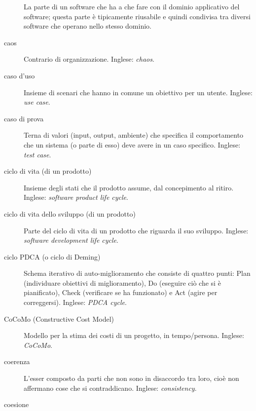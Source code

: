 \documentclass[a4paper]{article}
\begin{document}
\begin{description}
			La parte di un software che ha a che fare con il dominio applicativo del software; questa parte è tipicamente riusabile e quindi condivisa tra diversi software che operano nello stesso dominio.
			
	\item[caos] 

			Contrario di organizzazione. Inglese: \emph{chaos}.
			
	\item[caso d'uso] 

			Insieme di scenari che hanno in comune un obiettivo per un utente. Inglese: \emph{use case}.
			
	\item[caso di prova] 

			Terna di valori (input, output, ambiente) che specifica il comportamento che un sistema (o parte di esso) deve avere in un caso specifico. Inglese: \emph{test case}.
			
	\item[ciclo di vita (di un prodotto)] 

			Insieme degli stati che il prodotto assume, dal concepimento al ritiro. Inglese: \emph{software product life cycle}.
			
	\item[ciclo di vita dello sviluppo (di un prodotto)] 

			Parte del ciclo di vita di un prodotto che riguarda il suo sviluppo. Inglese: \emph{software development life cycle}.
			
	\item[ciclo PDCA (o ciclo di Deming)] 

			Schema iterativo di auto-miglioramento che consiste di quattro punti: Plan (individuare obiettivi di miglioramento), Do (eseguire ciò che si è pianificato), Check (verificare se ha funzionato) e Act (agire per correggersi). Inglese: \emph{PDCA cycle}.
			
	\item[CoCoMo (Constructive Cost Model)] 

			Modello per la stima dei costi di un progetto, in tempo/persona. Inglese: \emph{CoCoMo}.
			
	\item[coerenza] 

			L'esser composto da parti che non sono in disaccordo tra loro, cioè non affermano cose che si contraddicano. Inglese: \emph{consistency}.
			
	\item[coesione] 


\end{description}
\end{document}
